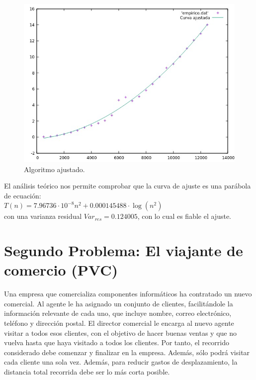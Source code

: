 \documentclass[a4paper,12pt,twoside]{article} %
\begin{document}
\begin{figure}[h]
  \begin{center}
  
  	\includegraphics[scale=0.7]{IMAGENES/ajustehibrido.jpeg}
  	\caption{Algoritmo ajustado.}
  	
  \end{center}
\end{figure}


El análisis teórico nos permite comprobar que la curva de ajuste es una parábola de ecuación:\\

$T(n) = 7.96736 \cdot{10^{-8}} n^2 +0.000145488\cdot \log{(n^2)}$\\

con una varianza residual $Var_{res} =0.124005$, con lo cual es fiable el ajuste.

\newpage

\section{Segundo Problema: El viajante de comercio (PVC)}

Una empresa que comercializa componentes informáticos ha contratado un nuevo comercial. Al agente le ha asignado un conjunto de clientes, facilitándole la información relevante de cada uno, que incluye nombre, correo electrónico, teléfono y dirección postal. El director comercial le encarga al nuevo agente visitar a todos esos clientes, con el objetivo de hacer buenas ventas y que no vuelva hasta que haya visitado a todos los clientes. Por tanto, el recorrido considerado debe comenzar y finalizar en la empresa. Además, sólo podrá visitar cada cliente una sola vez. Además, para reducir gastos de desplazamiento, la distancia total recorrida debe ser lo más corta posible.
\end{document}
